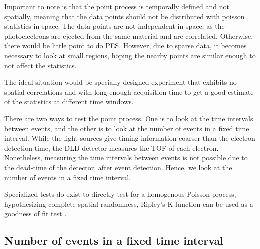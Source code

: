 Important to note is that the point process is temporally defined and not spatially, meaning that the data points should not be distributed with poisson statistics in space. The data points are not independent in space, as the photoelectrons are ejected from the same material and are correlated. Otherwise, there would be little point to do \gls{PES}.
However, due to sparse data, it becomes necessary to look at small regions, hoping the nearby points are similar enough to not affect the statistics.

The ideal situation would be specially designed experiment that exhibits no spatial correlations and with long enough acquisition time to get a good estimate of the statistics at different time windows.

There are two ways to test the point process. One is to look at the time intervals between events, and the other is to look at the number of events in a fixed time interval. While the light sources give timing information coarser than the electron detection time, the \gls{DLD} detector measures the \gls{TOF} of each electron. Nonetheless, measuring the time intervals between events is not possible due to the dead-time of the detector, after event detection. Hence, we look at the number of events in a fixed time interval.

Specialized tests do exist to directly test for a homogenous Poisson process, hypothesizing complete spatial randomness, Ripley's K-function can be used as a goodness of fit test \cite[Section~2.6.4]{chiuStochasticGeometryIts2013}.

\subsection{Number of events in a fixed time interval}

